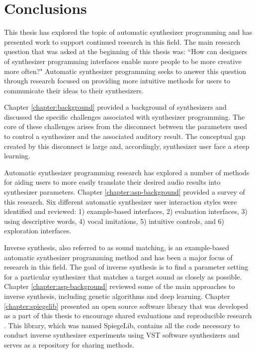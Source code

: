\chapter{Conclusions} %
This thesis has explored the topic of automatic synthesizer programming and has presented work to support continued research in this field. The main research question that was asked at the beginning of this thesis was: ``How can designers of synthesizer programming interfaces enable more people to be more creative more often?" Automatic synthesizer programming seeks to answer this question through research focused on providing more intuitive methods for users to communicate their ideas to their synthesizers.

Chapter \ref{chapter:background} provided a background of synthesizers and discussed the specific challenges associated with synthesizer programming. The core of these challenges arises from the disconnect between the parameters used to control a synthesizer and the associated auditory result. The conceptual gap created by this disconnect is large and, accordingly, synthesizer user face a steep learning. 

Automatic synthesizer programming research has explored a number of methods for aiding users to more easily translate their desired audio results into synthesizer parameters. Chapter \ref{chapter:asp-background} provided a survey of this research. Six different automatic synthesizer user interaction styles were identified and reviewed: 1) example-based interfaces, 2) evaluation interfaces, 3) using descriptive words, 4) vocal imitations, 5) intuitive controls, and 6) exploration interfaces.

Inverse synthesis, also referred to as sound matching, is an example-based automatic synthesizer programming method and has been a major focus of research in this field. The goal of inverse synthesis is to find a parameter setting for a particular synthesizer that matches a target sound as closely as possible. Chapter \ref{chapter:asp-background} reviewed some of the main approaches to inverse synthesis, including genetic algorithms and deep learning. Chapter \ref{chapter:spiegelib} presented an open source software library that was developed as a part of this thesis to encourage shared evaluations and reproducible research \cite{vandewalle2009reproducible}. This library, which was named SpiegeLib, contains all the code necessary to conduct inverse synthesizer experiments using VST software synthesizers and serves as a repository for sharing methods.

